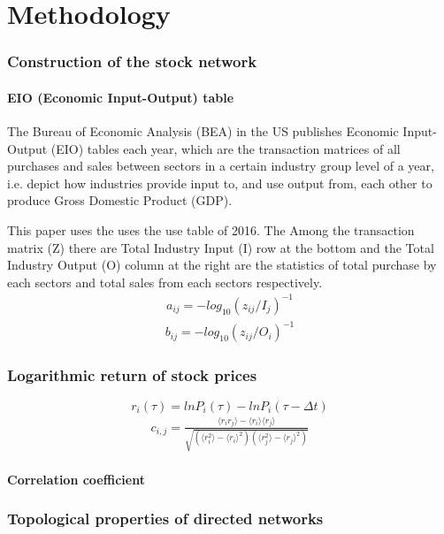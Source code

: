 \chapter{Methodology}
\label{cha:intro}

\subsection{Construction of the stock network}
\subsubsection{EIO (Economic Input-Output) table}

The Bureau of Economic Analysis (BEA) in the US publishes Economic Input-Output (EIO) tables each year, which are the transaction matrices of all purchases and sales between sectors in a certain industry group level of a year, i.e. depict how industries provide input to, and use output from, each other to produce Gross Domestic Product (GDP).

This paper uses the uses the use table of 2016. The Among the transaction matrix (Z) there are Total Industry Input (I) row at the bottom and the Total Industry Output (O) column at the right are the statistics of total purchase by each sectors and total sales from each sectors respectively.
\begin{eqnarray}\label{equ:eio_i}
a_{ij} = -log_{10}(z_{ij} / I_j)^{-1}
\end{eqnarray}
\begin{eqnarray}\label{equ:eio_o}
b_{ij} = -log_{10}(z_{ij} / O_i)^{-1}
\end{eqnarray}
\subsection{Logarithmic return of stock prices}
$$r_i(\tau)=lnP_i(\tau)-lnP_i(\tau-\Delta t)$$
\begin{eqnarray}\label{equ:corr}
	c_{i,j}=\frac{\langle r_ir_j \rangle-\langle r_i\rangle \langle r_j\rangle}{\sqrt{(\langle r_i^2\rangle-\langle r_i\rangle^2)(\langle r_j^2\rangle-\langle r_j\rangle^2)}}
\end{eqnarray}
\subsubsection{Correlation coefficient}


\subsection{Topological properties of directed networks}
\label{sec:aim}
